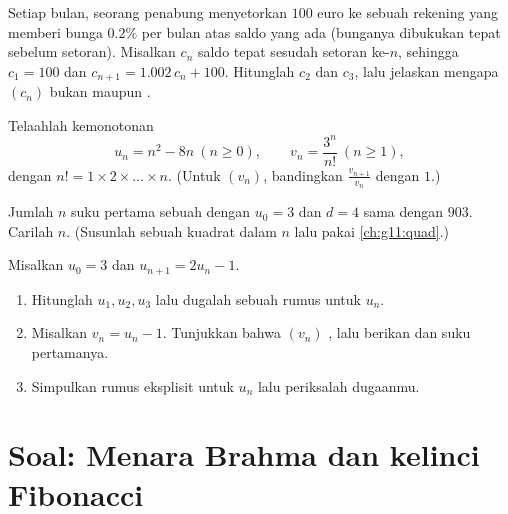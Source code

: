 \begin{exercise}[$\star\star$]\label{exo:g11:seq:8}
Setiap bulan, seorang penabung menyetorkan $100$ euro ke sebuah rekening yang
memberi bunga $0.2\%$ per bulan atas saldo yang ada (bunganya dibukukan
tepat sebelum setoran). Misalkan $c_n$ saldo tepat sesudah setoran ke-$n$,
sehingga $c_1 = 100$ dan $c_{n+1} = 1.002\,c_n + 100$. Hitunglah $c_2$
dan $c_3$, lalu jelaskan mengapa $(c_n)$ bukan  maupun .
\end{exercise}

\begin{exercise}[$\star\star$]\label{exo:g11:seq:9}
Telaahlah kemonotonan 
\[
u_n = n^2 - 8n \ (n \geq 0), \qquad
v_n = \frac{3^n}{n!}\ (n \geq 1),
\]
dengan $n! = 1 \times 2 \times \dots \times n$. (Untuk $(v_n)$, bandingkan
$\frac{v_{n+1}}{v_n}$ dengan $1$.)
\end{exercise}

\begin{exercise}[$\star\star$]\label{exo:g11:seq:10}
Jumlah $n$ suku pertama sebuah  dengan $u_0 = 3$
dan $d = 4$ sama dengan $903$. Carilah $n$. (Susunlah sebuah  kuadrat
dalam $n$ lalu pakai \cref{ch:g11:quad}.)
\end{exercise}

\begin{exercise}[$\star\star\star$]\label{exo:g11:seq:11}
Misalkan $u_0 = 3$ dan $u_{n+1} = 2u_n - 1$.
\begin{enumerate}
  \item Hitunglah $u_1, u_2, u_3$ lalu dugalah sebuah rumus untuk $u_n$.
  \item Misalkan $v_n = u_n - 1$. Tunjukkan bahwa $(v_n)$ , lalu
        berikan  dan suku pertamanya.
  \item Simpulkan rumus eksplisit untuk $u_n$ lalu periksalah dugaanmu.
\end{enumerate}
\end{exercise}

\section{Soal: Menara Brahma dan kelinci Fibonacci}

